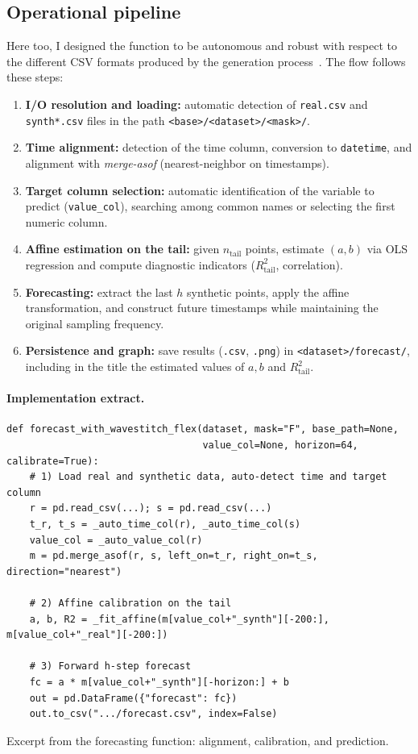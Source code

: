 \subsection{Operational pipeline}
Here too, I designed the function to be autonomous and robust with respect to the different CSV formats produced by the generation process~\cite{han2011data}.  
The flow follows these steps:
\begin{enumerate}
  \item \textbf{I/O resolution and loading:} automatic detection of \texttt{real.csv} and \texttt{synth*.csv} files in the path \texttt{<base>/<dataset>/<mask>/}.
  \item \textbf{Time alignment:} detection of the time column, conversion to \texttt{datetime}, and alignment with \emph{merge-asof} (nearest-neighbor on timestamps).
  \item \textbf{Target column selection:} automatic identification of the variable to predict (\texttt{value\_col}), searching among common names or selecting the first numeric column.
  \item \textbf{Affine estimation on the tail:} given $n_{\text{tail}}$ points, estimate $(a,b)$ via OLS regression and compute diagnostic indicators ($R^2_{\text{tail}}$, correlation).
  \item \textbf{Forecasting:} extract the last $h$ synthetic points, apply the affine transformation, and construct future timestamps while maintaining the original sampling frequency.
  \item \textbf{Persistence and graph:} save results (\texttt{.csv}, \texttt{.png}) in \texttt{<dataset>/forecast/}, including in the title the estimated values of $a,b$ and $R^2_{\text{tail}}$.
\end{enumerate}

\paragraph{Implementation extract.}
\begin{listing}[H]
\begin{verbatim}
def forecast_with_wavestitch_flex(dataset, mask="F", base_path=None,
                                  value_col=None, horizon=64, calibrate=True):
    # 1) Load real and synthetic data, auto-detect time and target column
    r = pd.read_csv(...); s = pd.read_csv(...)
    t_r, t_s = _auto_time_col(r), _auto_time_col(s)
    value_col = _auto_value_col(r)
    m = pd.merge_asof(r, s, left_on=t_r, right_on=t_s, direction="nearest")

    # 2) Affine calibration on the tail
    a, b, R2 = _fit_affine(m[value_col+"_synth"][-200:], m[value_col+"_real"][-200:])

    # 3) Forward h-step forecast
    fc = a * m[value_col+"_synth"][-horizon:] + b
    out = pd.DataFrame({"forecast": fc})
    out.to_csv(".../forecast.csv", index=False)
\end{verbatim}
\caption{Excerpt from the forecasting function: alignment, calibration, and prediction.}
\end{listing}

